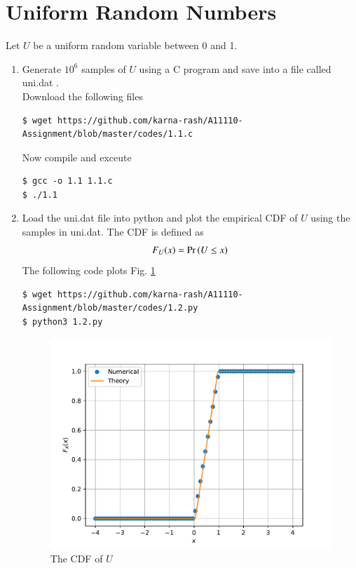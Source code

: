\documentclass[journal,12pt,twocolumn]{IEEEtran}
\renewcommand\thesection{\arabic{section}}
\begin{document}
\section{Uniform Random Numbers}
Let $U$ be a uniform random variable between 0 and 1.
\begin{enumerate}[label=\thesection.\arabic*
,ref=\thesection.\theenumi]
\item Generate $10^6$ samples of $U$ using a C program and save into a file called uni.dat .
\\
\solution Download the following files
\begin{lstlisting}
$ wget https://github.com/karna-rash/A11110-Assignment/blob/master/codes/1.1.c
\end{lstlisting}
Now compile and exceute
\begin{lstlisting}
$ gcc -o 1.1 1.1.c
$ ./1.1
\end{lstlisting}

%
\item
Load the uni.dat file into python and plot the empirical CDF of $U$ using the samples in uni.dat. The CDF is defined as
\begin{align}
F_{U}(x) = \Pr\left(U \le x\right)
\end{align}
\solution  The following code plots Fig. \ref{fig:uni_cdf}
\begin{lstlisting}
$ wget https://github.com/karna-rash/A11110-Assignment/blob/master/codes/1.2.py
$ python3 1.2.py
\end{lstlisting}
\begin{figure}
\centering
\includegraphics[width=\columnwidth]{./figs/uni_cdf}
\caption{The CDF of $U$}
\label{fig:uni_cdf}
\end{figure}


\end{enumerate}
\end{document}

